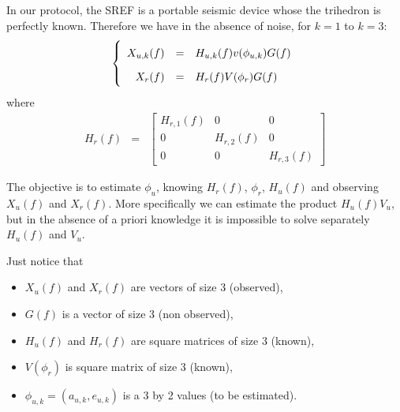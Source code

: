 \documentclass[a4paper, 12pt]{report}
\begin{document}
In our protocol, the  SREF is a portable seismic device whose the trihedron  is perfectly known. 
Therefore we have in the absence of noise, for $k=1$ to $k=3$:
\begin{eqnarray}
\label{eq:signalmodel}
\left\{
\renewcommand\arraystretch{1.8}
\begin{array}{rcl}
X_{u,k}(f)&=&H_{u,k}(f)v(\phi_{u,k})G(f)
\\
X_{r}(f)&=&H_{r}(f)V(\phi_{r})G(f)
\end{array}
\right.
\end{eqnarray}
where
\begin{eqnarray*}
H_{r}(f)&=&\begin{bmatrix}
H_{r,1}(f)&0&0
\\
0&H_{r,2}(f)&0
\\
0&0&H_{r,3}(f)
\end{bmatrix}
\end{eqnarray*}



The objective is to estimate $\phi_{u}$, knowing $H_{r}(f)$,  $\phi_{r}$, $H_{u}(f)$ and observing $X_{u}(f)$ and $X_{r}(f)$.
More specifically we can estimate the product $H_{u}(f)V_{u}$, but in the absence of a priori knowledge it is impossible to solve separately $H_{u}(f)$ and $V_{u}$.

Just notice that 
\begin{itemize}
\item
$X_{u}(f)$ and $X_{r}(f)$ are vectors of size 3 (observed),
\item
$G(f)$ is a vector of size 3 (non observed),
\item
$H_{u}(f)$ and $H_{r}(f)$ are square matrices of size 3 (known),
\item
$V(\phi_{r})$ is square matrix of size 3 (known),
\item
$\phi_{u,k}=(a_{u,k},e_{u,k})$ is a 3 by 2 values (to be estimated). 
\end{itemize}
\end{document}
